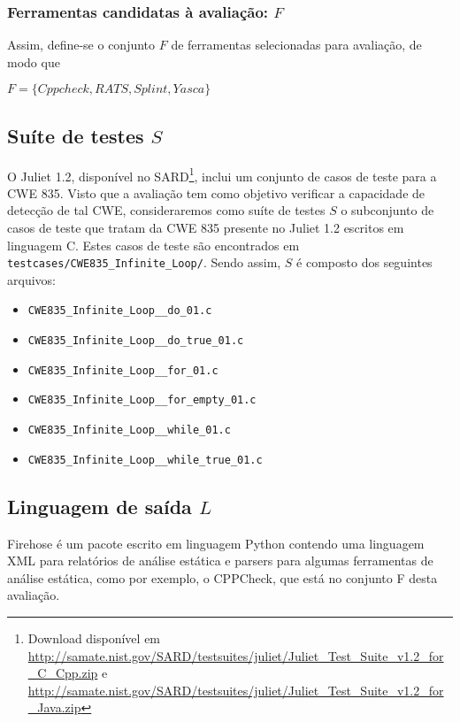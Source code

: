 \subsubsection{Ferramentas candidatas à avaliação: $F$}

Assim, define-se o conjunto $F$ de ferramentas selecionadas para avaliação, de modo que

$F = \lbrace Cppcheck, RATS, Splint, Yasca\rbrace$

\subsection{Suíte de testes $S$}

O Juliet 1.2, disponível no SARD\footnote{Download disponível em \url{http://samate.nist.gov/SARD/testsuites/juliet/Juliet_Test_Suite_v1.2_for_C_Cpp.zip} e \url{http://samate.nist.gov/SARD/testsuites/juliet/Juliet_Test_Suite_v1.2_for_Java.zip}}, inclui um conjunto de casos de teste para a CWE 835. Visto que a avaliação tem como objetivo verificar a capacidade de detecção de tal CWE, consideraremos como suíte de testes $S$ o subconjunto de casos de teste que tratam da CWE 835 presente no Juliet 1.2 escritos em linguagem C. Estes casos de teste são encontrados em \lstinline{testcases/CWE835_Infinite_Loop/}. Sendo assim, $S$ é composto dos seguintes arquivos:
\begin{itemize}
  \item \lstinline{CWE835_Infinite_Loop__do_01.c}
  \item \lstinline{CWE835_Infinite_Loop__do_true_01.c}
  \item \lstinline{CWE835_Infinite_Loop__for_01.c}
  \item \lstinline{CWE835_Infinite_Loop__for_empty_01.c}
  \item \lstinline{CWE835_Infinite_Loop__while_01.c}
  \item \lstinline{CWE835_Infinite_Loop__while_true_01.c}
\end{itemize}

\subsection{Linguagem de saída $L$}

Firehose é um pacote escrito em linguagem Python contendo uma linguagem XML para relatórios de análise estática e parsers para algumas ferramentas de análise estática, como por exemplo, o CPPCheck, que está no conjunto F desta avaliação.

